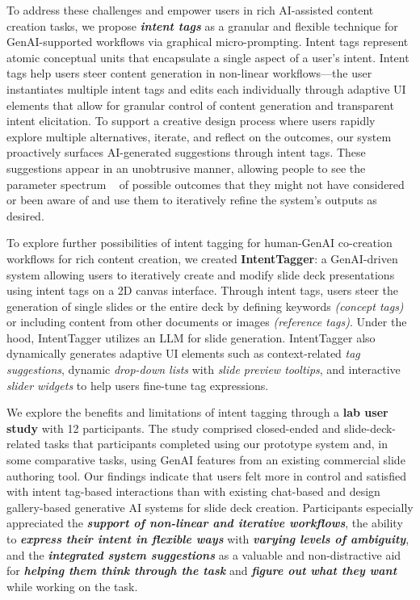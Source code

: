 To address these challenges and empower users in rich AI-assisted content creation tasks, we propose \textbf{\textit{intent tags}} as a granular and flexible technique for GenAI-supported workflows via graphical micro-prompting. 
Intent tags represent atomic conceptual units that encapsulate a single aspect of a user's intent. Intent tags help users steer content generation in non-linear workflows---the user instantiates multiple intent tags and edits each individually through adaptive UI elements that allow for granular control of content generation and transparent intent elicitation.
To support a creative design process where users rapidly explore multiple alternatives, iterate, and reflect on the outcomes, our system proactively surfaces AI-generated suggestions through intent tags. These suggestions appear in an unobtrusive manner, allowing people to see the parameter spectrum ~\cite{TerryCreativeNeedsUIDesign2002} of possible outcomes that they might not have considered or been aware of and use them to iteratively refine the system's outputs as desired. 

To explore further possibilities of intent tagging for human-GenAI co-creation workflows for rich content creation, we created \textbf{IntentTagger}: a GenAI-driven system allowing users to iteratively create and modify slide deck presentations using intent tags on a 2D canvas interface. Through intent tags, users steer the generation of single slides or the entire deck by defining keywords \textit{(concept tags)} or including content from other documents or images \textit{(reference tags)}. 
Under the hood, IntentTagger utilizes an LLM for slide generation. IntentTagger also dynamically generates adaptive UI elements such as context-related \textit{tag suggestions}, dynamic \textit{drop-down lists} with \textit{slide preview tooltips}, and interactive \textit{slider widgets} to help users fine-tune tag expressions.    

We explore the benefits and limitations of intent tagging through a \textbf{lab user study} with 12 participants. 
The study comprised  closed-ended and  slide-deck-related tasks that participants completed using our prototype system and, in some comparative tasks, using GenAI features from an existing commercial slide authoring tool. 
Our findings indicate that users felt more in control and satisfied with intent tag-based interactions than with existing chat-based and design gallery-based generative AI systems for slide deck creation.
Participants especially appreciated the \textit{\textbf{support of non-linear and iterative workflows}}, the ability to \textbf{\textit{express their intent in flexible ways}} with \textbf{\textit{varying levels of ambiguity}}, and the \textbf{\textit{integrated system suggestions}} as a valuable and non-distractive aid for \textbf{\textit{helping them think through the task}} and \textbf{\textit{figure out what they want}} while working on the task.

